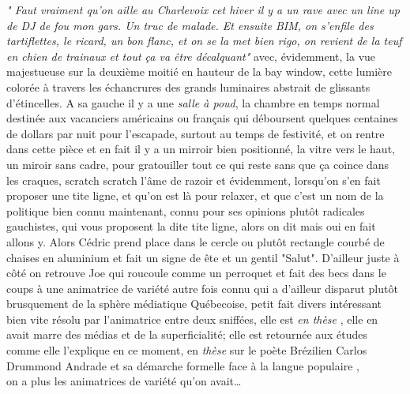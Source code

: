 \begin{paracol}{2}

\phantom
\small
\textit{"\textelp{} Faut vraiment qu'on aille au Charlevoix cet hiver
il y a un rave avec un line up de DJ de fou mon gars. Un truc de malade. 
Et ensuite BIM, on s'enfile des tartiflettes, le ricard, un bon flanc, 
et on se la met bien rigo, on revient de la teuf en chien de trainaux
et tout ça va être décalquant"}
\switchcolumn
{}
avec, évidemment, la vue majestueuse sur la deuxième moitié en hauteur de la bay
window, cette lumière colorée à travers les échancrures des grands luminaires
abstrait de glissants d'étincelles.  
A sa gauche il y a une \emph{salle à poud}, la chambre en temps normal 
destinée aux vacanciers
américains ou français qui déboursent quelques centaines de dollars par nuit
pour l'escapade, surtout au temps de festivité, et on rentre dans cette pièce
et en fait il y a un mirroir bien positionné, la vitre vers le haut, un miroir
sans cadre, pour gratouiller tout ce qui reste sans que ça coince dans les
craques, scratch scratch l'âme de razoir et évidemment, lorsqu'on s'en fait
proposer une tite ligne, et qu'on est là pour relaxer, et que c'est un nom de
la politique bien connu maintenant, connu pour ses opinions plutôt radicales
gauchistes, qui vous proposent la dite tite ligne, alors on dit mais oui en fait
allons y. Alors Cédric prend place dans le cercle ou plutôt rectangle courbé
de chaises en aluminium et fait un signe de ête et un gentil "Salut". 
D'ailleur juste à côté on retrouve Joe qui roucoule comme un
perroquet et fait des becs dans le coups à une animatrice
de variété autre fois connu qui a d'ailleur disparut plutôt brusquement de la
sphère médiatique Québecoise, petit fait divers intéressant bien vite résolu par
l'animatrice entre deux sniffées, elle est \emph{en thèse} , elle en avait marre
des médias et de la superficialité; elle est retournée aux études comme elle
l'explique en ce moment, en \emph{thèse} sur le poète Brézilien Carlos Drummond
Andrade et sa démarche formelle face à la langue populaire , \\ on a plus les
animatrices de variété qu'on avait\ldots
\end{paracol}

